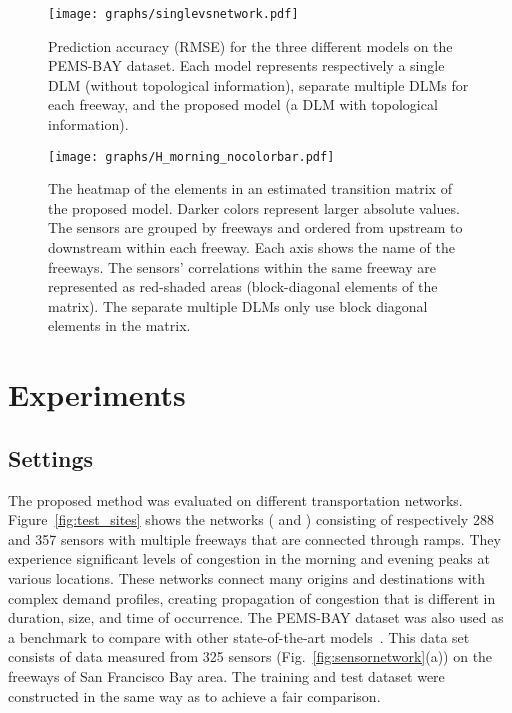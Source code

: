 \documentclass[journal]{IEEEtran}
\begin{document}
\begin{figure}[!t]
   \centering
   {\texttt{[image: graphs/singlevsnetwork.pdf]}}
   \caption{Prediction accuracy (RMSE) for the three different models on the PEMS-BAY dataset. Each model represents respectively a single DLM (without topological information), separate multiple DLMs for each freeway, and the proposed model (a DLM with topological information).}\label{fig:single_vs_network}
\end{figure}
\begin{figure}[!t]
   \centering
   {\texttt{[image: graphs/H\_morning\_nocolorbar.pdf]}}
   \caption{The heatmap of the elements in an estimated transition matrix  of the proposed model.
   Darker colors represent larger absolute values.
   The sensors are grouped by freeways and ordered from upstream to downstream within each freeway. Each axis shows the name of the freeways. The sensors' correlations within the same freeway are represented as red-shaded areas (block-diagonal elements of the matrix). The separate multiple DLMs only use block diagonal elements in the matrix.
   }
   \label{fig:h_morning}
\end{figure}


\section{Experiments}
\subsection{Settings}

The proposed method was evaluated on different transportation networks. Figure~\ref{fig:test_sites} shows the networks ( and ) consisting of respectively 288 and 357 sensors with multiple freeways that are connected through ramps. They experience significant levels of congestion in the morning and evening peaks at various locations. 
These networks connect many origins and destinations with complex demand profiles, creating propagation of congestion that is different in duration, size, and time of occurrence. 
The PEMS-BAY dataset was also used as a benchmark to compare with other state-of-the-art models~\cite{li2018diffusion,wu2019graph}. This data set consists of data measured from 325 sensors (Fig.~\ref{fig:sensornetwork}(a)) on the freeways of San Francisco Bay area. The training and test dataset were constructed in the same way as \cite{li2018diffusion,wu2019graph} to achieve a fair comparison.
\end{document}
